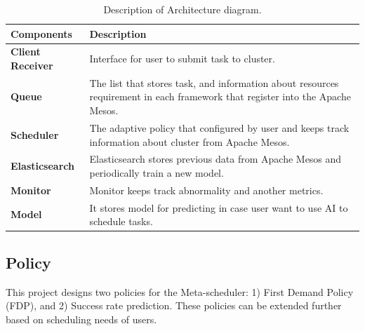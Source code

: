 \documentclass[12pt,oneside,openright,a4paper]{cpe-english-project}
\begin{document}
\begin{table}[!h]
\caption{Description of Architecture diagram.}\label{tbl:ArchitectureDiagramTable}
\begin{tabular}{@{}|p{}|p{}|}
\hline
\textbf{Components} & \textbf{Description}\\
\hline
\textbf{Client Receiver} & Interface for user to submit task to cluster.\\
\hline
\textbf{Queue} & The list that stores task, and information about resources requirement in each framework that register into the Apache Mesos.\\
\hline
\textbf{Scheduler} & The adaptive policy that configured by user and keeps track information about cluster from Apache Mesos.\\
\hline
\textbf{Elasticsearch} & Elasticsearch stores previous data from Apache Mesos and periodically train a new model.\\
\hline
\textbf{Monitor} & Monitor keeps track abnormality and another metrics.\\
\hline
\textbf{Model} & It stores model for predicting in case user want to use AI to schedule tasks.\\
\hline
\end{tabular}
\end{table}

\subsection{Policy}  
This project designs two policies for the Meta-scheduler: 1) First Demand Policy (FDP), and 2) Success rate prediction. These policies can be extended further based on scheduling needs of users. 
\end{document}
